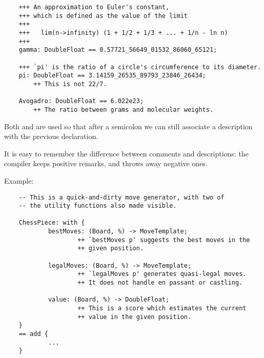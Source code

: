 \begin{small}
\begin{verbatim}
    +++ An approximation to Euler's constant,
    +++ which is defined as the value of the limit
    +++
    +++   lim(n->infinity) (1 + 1/2 + 1/3 + ... + 1/n - ln n)
    +++
    gamma: DoubleFloat == 0.57721_56649_01532_86060_65121;

    +++ `pi' is the ratio of a circle's circumference to its diameter.
    pi: DoubleFloat == 3.14159_26535_89793_23846_26434;
        ++ This is not 22/7.

    Avogadro: DoubleFloat == 6.022e23;
        ++ The ratio between grams and molecular weights.
\end{verbatim}
\end{small}

Both \ttin{+++} and \ttin{++} are used so that after a semicolon we can
still associate a description with the previous declaration.

It is easy to remember the difference between comments and descriptions:
the \asharp{} compiler keeps positive remarks, and throws away negative ones.

Example:
\begin{small}
\begin{verbatim}
    -- This is a quick-and-dirty move generator, with two of
    -- the utility functions also made visible.

    ChessPiece: with {
            bestMoves: (Board, %) -> MoveTemplate;
                    ++ `bestMoves p' suggests the best moves in the
                    ++ given position.

            legalMoves: (Board, %) -> MoveTemplate;
                    ++ `legalMoves p' generates quasi-legal moves.
                    ++ It does not handle en passant or castling.

            value: (Board, %) -> DoubleFloat;
                    ++ This is a score which estimates the current
                    ++ value in the given position.
    }
    == add {
            ...
    }
\end{verbatim}
\end{small}


